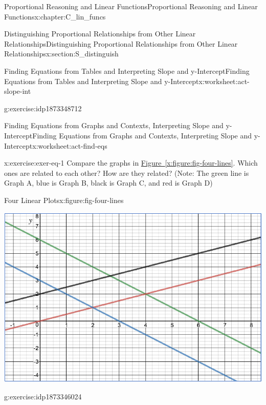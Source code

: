 \documentclass[oneside,10pt,]{book}
\newcommand{\xreffont}{\relax}
\numberwithin{equation}{chapter}
\begin{document}
\begin{chapterptx}{Proportional Reasoning and Linear Functions}{}{Proportional Reasoning and Linear Functions}{}{}{x:chapter:C_lin_funcs}
\begin{sectionptx}{Distinguishing Proportional Relationships from Other Linear Relationships}{}{Distinguishing Proportional Relationships from Other Linear Relationships}{}{}{x:section:S_distinguish}
\begin{worksheet-subsection}{Finding Equations from Tables and Interpreting Slope and y-Intercept}{}{Finding Equations from Tables and Interpreting Slope and y-Intercept}{}{}{x:worksheet:act-slope-int}
\begin{divisionexercise}{8}{}{}{g:exercise:idp1873348712}
\begin{enumerate}[font=\bfseries,label=(\alph*),ref=\alph*]
\end{enumerate}
\end{divisionexercise}%
\end{worksheet-subsection}
\restoregeometry
%
%
\typeout{************************************************}
\typeout{************************************************}
%
\begin{worksheet-subsection}{Finding Equations from Graphs and Contexts, Interpreting Slope and y-Intercept}{}{Finding Equations from Graphs and Contexts, Interpreting Slope and y-Intercept}{}{}{x:worksheet:act-find-eqs}
\begin{divisionexercise}{1}{}{}{x:exercise:exer-eq-1}%
Compare the graphs in \hyperref[x:figure:fig-four-lines]{Figure~{\xreffont\ref{x:figure:fig-four-lines}}}. Which ones are related to each other? How are they related? (Note: The green line is Graph A, blue is Graph B, black is Graph C, and red is Graph D)%
\begin{figureptx}{Four Linear Plots}{x:figure:fig-four-lines}{}%
\begin{image}{0.1}{0.8}{0.1}%
\includegraphics[width=\linewidth]{external/four-lines.pdf}
\end{image}%
\tcblower
\end{figureptx}%
\end{divisionexercise}%
\begin{divisionexercise}{2}{}{}{g:exercise:idp1873346024}%
\begin{enumerate}[font=\bfseries,label=(\alph*),ref=\alph*]

\end{enumerate}
\end{divisionexercise}
\end{worksheet-subsection}
\end{sectionptx}
\end{chapterptx}
\end{document}
